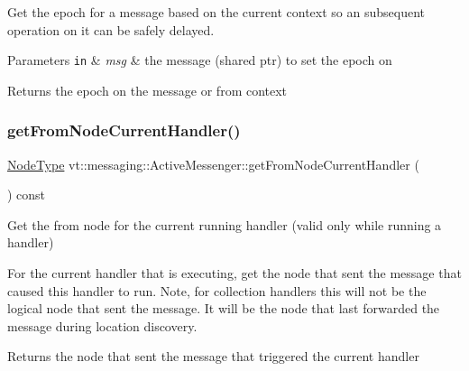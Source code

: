 Get the epoch for a message based on the current context so an subsequent operation on it can be safely delayed. 


\begin{DoxyParams}[1]{Parameters}
\mbox{\tt in}  & {\em msg} & the message (shared ptr) to set the epoch on\\
\hline
\end{DoxyParams}
\begin{DoxyReturn}{Returns}
the epoch on the message or from context 
\end{DoxyReturn}
\mbox{\label{structvt_1_1messaging_1_1_active_messenger_a433c49a43b304429aa2e046733dc8fde}} 
\subsubsection{\texorpdfstring{get\+From\+Node\+Current\+Handler()}{getFromNodeCurrentHandler()}}
{\footnotesize\ttfamily \hyperlink{namespacevt_a866da9d0efc19c0a1ce79e9e492f47e2}{Node\+Type} vt\+::messaging\+::\+Active\+Messenger\+::get\+From\+Node\+Current\+Handler (\begin{DoxyParamCaption}{ }\end{DoxyParamCaption}) const}



Get the from node for the current running handler (valid only while running a handler) 

For the current handler that is executing, get the node that sent the message that caused this handler to run. Note, for collection handlers this will not be the logical node that sent the message. It will be the node that last forwarded the message during location discovery.

\begin{DoxyReturn}{Returns}
the node that sent the message that triggered the current handler 
\end{DoxyReturn}
\mbox{\label{structvt_1_1messaging_1_1_active_messenger_abb892a84a906954d8769794ccfb0c638}} 
